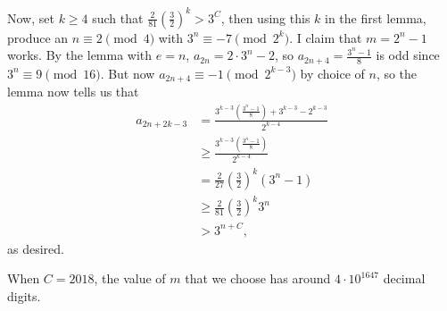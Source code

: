Now, set $k\geq4$ such that $\frac{2}{81}\left(\frac{3}{2}\right)^k>3^C$, then using this $k$ in the first lemma, produce an $n\equiv2\pmod4$ with $3^n\equiv-7\pmod{2^k}$. I claim that $m=2^n-1$ works. By the lemma with $e=n$, $a_{2n}=2\cdot3^n-2$, so $a_{2n+4}=\frac{3^n-1}{8}$ is odd since $3^n\equiv9\pmod{16}$. But now $a_{2n+4}\equiv-1\pmod{2^{k-3}}$ by choice of $n$, so the lemma now tells us that
\begin{align*}
	a_{2n+2k-3}&=\frac{3^{k-3}\left(\frac{3^n-1}{8}\right)+3^{k-3}-2^{k-3}}{2^{k-4}}\\
	&\geq\frac{3^{k-3}\left(\frac{3^n-1}{8}\right)}{2^{k-4}}\\
	&=\frac{2}{27}\left(\frac{3}{2}\right)^k\left(3^n-1\right)\\
	&\geq\frac{2}{81}\left(\frac{3}{2}\right)^k3^n\\
	&>3^{n+C},
\end{align*}
as desired.

\begin{remark}
When $C=2018$, the value of $m$ that we choose has around $4\cdot10^{1647}$ decimal digits.
\end{remark}